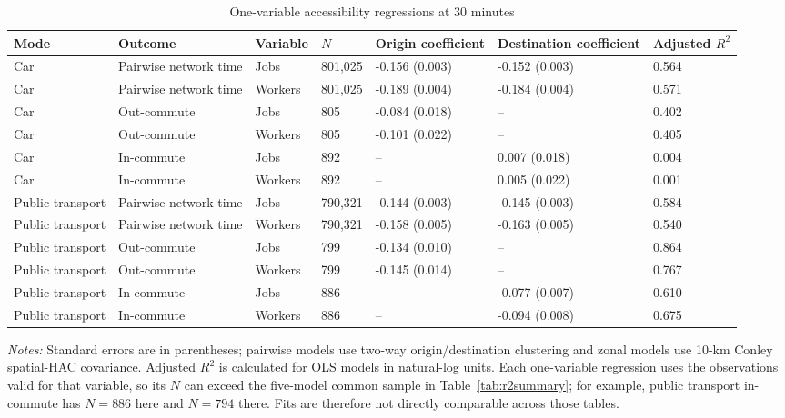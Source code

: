 \begin{table}[htbp]
\centering
\scriptsize
\caption{One-variable accessibility regressions at 30 minutes}
\label{tab:onevariable}
\begin{tabular}{lllllll}
\toprule
Mode & Outcome & Variable & $N$ & Origin coefficient & Destination coefficient & Adjusted $R^2$ \\
\midrule
Car & Pairwise network time & Jobs & 801,025 & -0.156 (0.003) & -0.152 (0.003) & 0.564 \\
Car & Pairwise network time & Workers & 801,025 & -0.189 (0.004) & -0.184 (0.004) & 0.571 \\
Car & Out-commute & Jobs & 805 & -0.084 (0.018) & -- & 0.402 \\
Car & Out-commute & Workers & 805 & -0.101 (0.022) & -- & 0.405 \\
Car & In-commute & Jobs & 892 & -- & 0.007 (0.018) & 0.004 \\
Car & In-commute & Workers & 892 & -- & 0.005 (0.022) & 0.001 \\
Public transport & Pairwise network time & Jobs & 790,321 & -0.144 (0.003) & -0.145 (0.003) & 0.584 \\
Public transport & Pairwise network time & Workers & 790,321 & -0.158 (0.005) & -0.163 (0.005) & 0.540 \\
Public transport & Out-commute & Jobs & 799 & -0.134 (0.010) & -- & 0.864 \\
Public transport & Out-commute & Workers & 799 & -0.145 (0.014) & -- & 0.767 \\
Public transport & In-commute & Jobs & 886 & -- & -0.077 (0.007) & 0.610 \\
Public transport & In-commute & Workers & 886 & -- & -0.094 (0.008) & 0.675 \\
\bottomrule
\end{tabular}
\par\vspace{2pt}
\begin{minipage}{0.96\linewidth}\footnotesize\textit{Notes:} Standard errors are in parentheses; pairwise models use two-way origin/destination clustering and zonal models use 10-km Conley spatial-HAC covariance. Adjusted $R^2$ is calculated for OLS models in natural-log units. Each one-variable regression uses the observations valid for that variable, so its $N$ can exceed the five-model common sample in Table~\ref{tab:r2summary}; for example, public transport in-commute has $N=886$ here and $N=794$ there. Fits are therefore not directly comparable across those tables.
\end{minipage}
\end{table}
